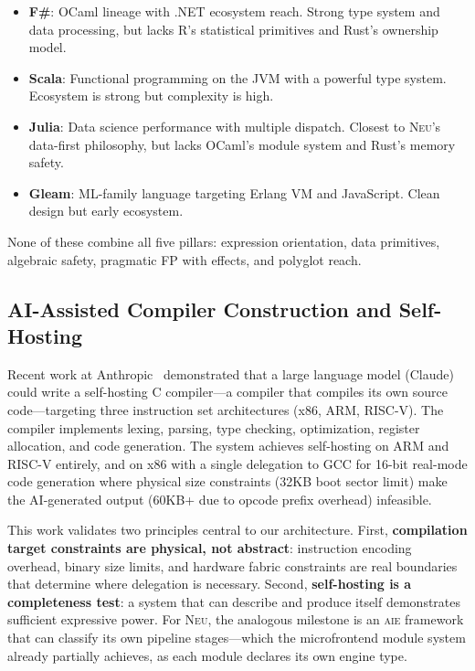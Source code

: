 \documentclass[11pt,letterpaper]{article}
\newcommand{\neu}{\textsc{Neu}}
\newcommand{\aie}{\textsc{aie}}
\begin{document}
\begin{itemize}[leftmargin=*]
  \item \textbf{F\#}: OCaml lineage with .NET ecosystem reach. Strong type system and data processing, but lacks R's statistical primitives and Rust's ownership model.
  \item \textbf{Scala}: Functional programming on the JVM with a powerful type system. Ecosystem is strong but complexity is high.
  \item \textbf{Julia}: Data science performance with multiple dispatch. Closest to \neu{}'s data-first philosophy, but lacks OCaml's module system and Rust's memory safety.
  \item \textbf{Gleam}: ML-family language targeting Erlang VM and JavaScript. Clean design but early ecosystem.
\end{itemize}

None of these combine all five pillars: expression orientation, data primitives, algebraic safety, pragmatic FP with effects, and polyglot reach.

\subsection{AI-Assisted Compiler Construction and Self-Hosting}

Recent work at Anthropic~\cite{anthropic2025} demonstrated that a large language model (Claude) could write a self-hosting C compiler---a compiler that compiles its own source code---targeting three instruction set architectures (x86, ARM, RISC-V). The compiler implements lexing, parsing, type checking, optimization, register allocation, and code generation. The system achieves self-hosting on ARM and RISC-V entirely, and on x86 with a single delegation to GCC for 16-bit real-mode code generation where physical size constraints (32KB boot sector limit) make the AI-generated output (60KB+ due to opcode prefix overhead) infeasible.

This work validates two principles central to our architecture. First, \textbf{compilation target constraints are physical, not abstract}: instruction encoding overhead, binary size limits, and hardware fabric constraints are real boundaries that determine where delegation is necessary. Second, \textbf{self-hosting is a completeness test}: a system that can describe and produce itself demonstrates sufficient expressive power. For \neu{}, the analogous milestone is an \aie{} framework that can classify its own pipeline stages---which the microfrontend module system already partially achieves, as each module declares its own engine type.
\end{document}
